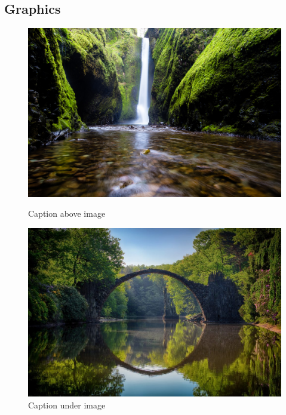 \documentclass{article}
\begin{document}
    \subsection{Graphics}

        \begin{figure}[!htp]
            \caption{Caption above image}
            \includegraphics[width=0.5\linewidth]{waterfall.jpg}
            \centering
            \label{fig:waterfall}
        \end{figure}

        \begin{figure}[!htp]
            \includegraphics[width=0.5\linewidth]{lake.jpg}
            \centering
            \caption{Caption under image}
            \label{fig:lake}
        \end{figure}
        \FloatBarrier
\end{document}

